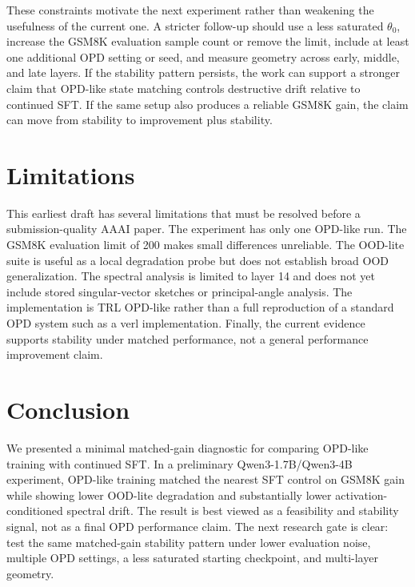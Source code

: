 \documentclass[letterpaper]{article}
\begin{document}
These constraints motivate the next experiment rather than weakening the usefulness of the current one.
A stricter follow-up should use a less saturated $\theta_0$, increase the GSM8K evaluation sample count or remove the limit, include at least one additional OPD setting or seed, and measure geometry across early, middle, and late layers.
If the stability pattern persists, the work can support a stronger claim that OPD-like state matching controls destructive drift relative to continued SFT.
If the same setup also produces a reliable GSM8K gain, the claim can move from stability to improvement plus stability.

\section{Limitations}

This earliest draft has several limitations that must be resolved before a submission-quality AAAI paper.
The experiment has only one OPD-like run.
The GSM8K evaluation limit of 200 makes small differences unreliable.
The OOD-lite suite is useful as a local degradation probe but does not establish broad OOD generalization.
The spectral analysis is limited to layer 14 and does not yet include stored singular-vector sketches or principal-angle analysis.
The implementation is TRL OPD-like rather than a full reproduction of a standard OPD system such as a verl implementation.
Finally, the current evidence supports stability under matched performance, not a general performance improvement claim.

\section{Conclusion}

We presented a minimal matched-gain diagnostic for comparing OPD-like training with continued SFT.
In a preliminary Qwen3-1.7B/Qwen3-4B experiment, OPD-like training matched the nearest SFT control on GSM8K gain while showing lower OOD-lite degradation and substantially lower activation-conditioned spectral drift.
The result is best viewed as a feasibility and stability signal, not as a final OPD performance claim.
The next research gate is clear: test the same matched-gain stability pattern under lower evaluation noise, multiple OPD settings, a less saturated starting checkpoint, and multi-layer geometry.



\end{document}
